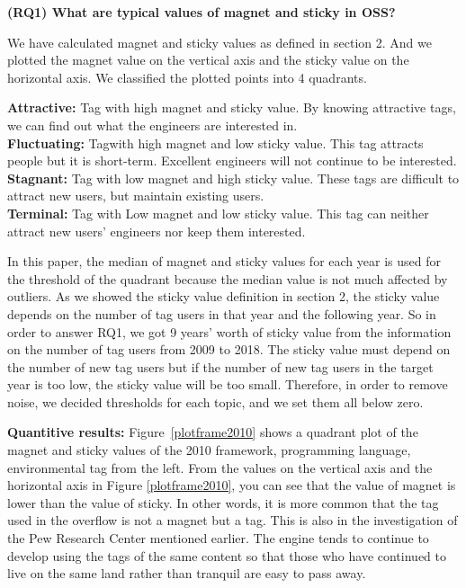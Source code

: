 \documentclass[conference]{IEEEtran}
\begin{document}
\textbf{(RQ1) What are typical values of magnet and sticky in OSS?}
\smallskip

We have calculated magnet and sticky values as defined in section 2. And we plotted the magnet value on the vertical axis and the sticky value on the horizontal axis. We classified the plotted points into 4 quadrants.
\smallskip
\smallskip

\textbf{Attractive:} Tag with high magnet and sticky value. By knowing attractive tags, we can find out what the engineers are interested in.\\
\textbf{Fluctuating:} Tagwith high magnet and low sticky value. This tag attracts people but it is short-term. Excellent engineers will not continue to be interested.\\
\textbf{Stagnant:} Tag with low magnet and high sticky value. These tags are difficult to attract new users, but maintain existing users.\\
\textbf{Terminal:} Tag with Low magnet and low sticky value. This tag can neither attract new users' engineers nor keep them interested.
\smallskip
\smallskip

In this paper, the median of magnet and sticky values for each year is used for the threshold of the quadrant because the median value is not much affected by outliers. As we showed the sticky value definition in section 2, the sticky value depends on the number of tag users in that year and the following year. So in order to answer RQ1, we got 9 years' worth of sticky value from the information on the number of tag users from 2009 to 2018. The sticky value must depend on the number of new tag users but if the number of new tag users in the target year is too low, the sticky value will be too small. Therefore, in order to remove noise, we decided thresholds for each topic, and we set them all below zero. 
\medskip


\textbf{Quantitive results:}
Figure~\ref{plotframe2010} shows a quadrant plot of the magnet and sticky values ​​of the 2010 framework, programming language, environmental tag from the left. From the values ​​on the vertical axis and the horizontal axis in Figure \ref{plotframe2010}, you can see that the value of magnet is lower than the value of sticky. In other words, it is more common that the tag used in the overflow is not a magnet but a tag. This is also in the investigation of the Pew Research Center mentioned earlier. The engine tends to continue to develop using the tags of the same content so that those who have continued to live on the same land rather than tranquil are easy to pass away.\smallskip
\smallskip
\end{document}
